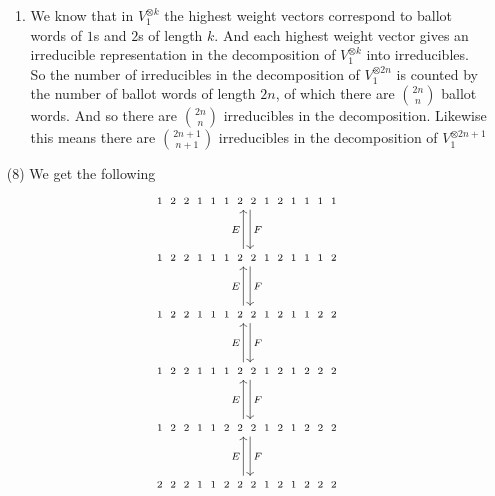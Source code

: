 \documentclass[12pt]{amsart}
\begin{document}
\begin{itemize}
\begin{enumerate}[label= (\alph*)]
      \item We know that in $V_1^{\otimes k}$ the highest weight vectors correspond to ballot words of $1$s and $2$s of length $k$.
      And each highest weight vector gives an irreducible representation in the decomposition of $V_1^{\otimes k}$ into irreducibles.
      So the number of irreducibles in the decomposition of $V_1^{\otimes 2n}$ is counted by the number of 
      ballot words of length $2n$, of which there are ${2n \choose n}$ ballot words. And so there are ${2n \choose n}$ irreducibles in the decomposition.
      Likewise this means there are ${2n+1 \choose n+1}$ irreducibles in the decomposition of $V_1^{\otimes 2n+1}$
     \end{enumerate}

     \item[(8)]
     We get the following
     \[\begin{tikzcd}[row sep=1cm, column sep=.65cm]
     \begin{smallmatrix}1&2&2&1&1&1&2&2&1&2&1&1&1&1\end{smallmatrix}\arrow[d, "F", shift left]\\
     \begin{smallmatrix}1&2&2&1&1&1&2&2&1&2&1&1&1&2\end{smallmatrix}\arrow[d, "F", shift left]\arrow[u, "E", shift left]\\
     \begin{smallmatrix}1&2&2&1&1&1&2&2&1&2&1&1&2&2\end{smallmatrix}\arrow[d, "F", shift left]\arrow[u, "E", shift left]\\
     \begin{smallmatrix}1&2&2&1&1&1&2&2&1&2&1&2&2&2\end{smallmatrix}\arrow[d, "F", shift left]\arrow[u, "E", shift left]\\
     \begin{smallmatrix}1&2&2&1&1&2&2&2&1&2&1&2&2&2\end{smallmatrix}\arrow[d, "F", shift left]\arrow[u, "E", shift left]\\
     \begin{smallmatrix}2&2&2&1&1&2&2&2&1&2&1&2&2&2\end{smallmatrix}\arrow[u, "E", shift left]\\
    \end{tikzcd}\]
     
\end{itemize}
\end{document}
